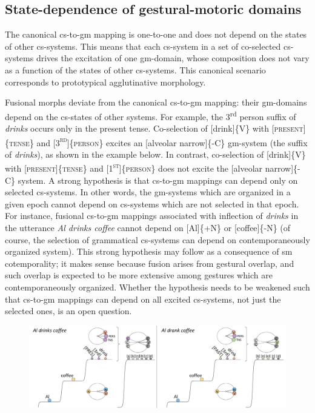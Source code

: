 \subsection{State-dependence of gestural-motoric domains}

The canonical cs-to-gm mapping is one-to-one and does not depend on the states of other cs-systems. This means that each cs-system in a set of co-selected cs-systems drives the excitation of one gm-domain, whose composition does not vary as a function of the states of other cs-systems. This canonical scenario corresponds to prototypical agglutinative morphology. 

  Fusional morphs deviate from the canonical cs-to-gm mapping: their gm-domains depend on the cs-states of other systems. For example, the 3\textsuperscript{rd} person suffix of \textit{drinks} occurs only in the present tense. Co-selection of [drink]\{V\} with [\textsc{present}]\{\textsc{tense}\} and [\textsc{3}\textsc{\textsuperscript{rd}}]\{\textsc{person}\} excites an [alveolar narrow]\{-C\} gm-system (the suffix of \textit{drinks}), as shown in the example below. In contrast, co-selection of [drink]\{V\} with [\textsc{present]}\{\textsc{tense}\} and [\textsc{1}\textsc{\textsuperscript{st}}]\{\textsc{person}\} does not excite the [alveolar narrow]\{-C\} system. A strong hypothesis is that cs-to-gm mappings can depend only on selected cs-systems. In other words, the gm-systems which are organized in a given epoch cannot depend on cs-systems which are not selected in that epoch. For instance, fusional cs-to-gm mappings associated with inflection of \textit{drinks} in the utterance \textit{Al drinks coffee} cannot depend on [Al]\{+N\} or [coffee]\{-N\} (of course, the selection of grammatical cs-systems can depend on contemporaneously organized system). This strong hypothesis may follow as a consequence of sm cotemporality; it makes sense because fusion arises from gestural overlap, and such overlap is expected to be more extensive among gestures which are contemporaneously organized. Whether the hypothesis needs to be weakened such that cs-to-gm mappings can depend on all excited cs-systems, not just the selected ones, is an open question.

  
\begin{figure}
\includegraphics[width=\textwidth]{figures/Tilsen-img69.png}
\caption{\missingcaption}
\label{fig:}
\end{figure}
 

